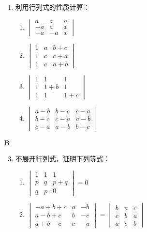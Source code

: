 \begin{enumerate}
\item 利用行列式的性质计算：
\begin{multicols}{2}
\begin{enumerate}[(1)]
  \item $\begin{vmatrix}a&a&a\\-a&a&x\\-a&-a&x\end{vmatrix}$
  \item $\begin{vmatrix}1&a&b+c\\1&c&c+a\\1&c&a+b\end{vmatrix}$
  \item $\begin{vmatrix}1&1&1\\1&1+b&1\\1&1&1+c\end{vmatrix}$
  \item $\begin{vmatrix}a-b&b-c&c-a\\b-c&c-a&a-b\\c-a&a-b&b-c\end{vmatrix}$
\end{enumerate}
\end{multicols}

\end{enumerate}

\begin{center}
  \bfseries B
\end{center}

\begin{enumerate}\setcounter{enumi}{2}
  \item 不展开行列式，证明下列等式：
\begin{enumerate}[(1)]
  \item $\begin{vmatrix}
    1&1&1\\ p&q&p+q\\
    q&p&0
  \end{vmatrix}=0$
  \item $\begin{vmatrix}
    -a+b+c&a&-b\\ a-b+c& b&-c\\a+b-c&c&-a
  \end{vmatrix}=\begin{vmatrix}
    b&a&c\\c&b&a\\a&c&b
  \end{vmatrix}$
\end{enumerate}
\end{enumerate}

